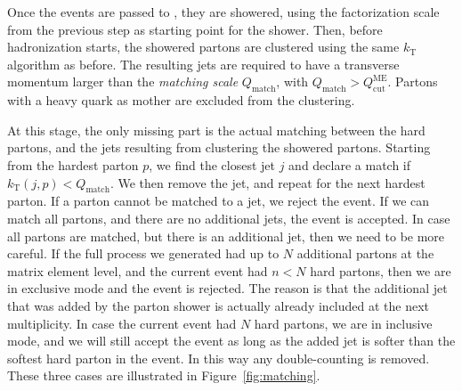 Once the events are passed to \PYTHIA, they are showered, using the factorization scale from the
previous step as starting point for the shower. Then, before hadronization starts, the showered
partons are clustered using the same $k_{\mathrm{T}}$ algorithm as before. The resulting jets are
required to have a transverse momentum larger than the \textit{matching scale} $Q_{\mathrm{match}}$,
with $Q_{\mathrm{match}} > Q_{\mathrm{cut}}^{\mathrm{ME}}$. 
Partons with a heavy quark as mother are excluded from the clustering. 

At this stage, the only missing part is the actual matching between the hard partons, and the jets
resulting from clustering the showered partons. Starting from the hardest parton $p$, we find the
closest jet $j$ and declare a match if $k_{\mathrm{T}}(j,p) < Q_{\mathrm{match}}$. We then remove
the jet, and repeat for the next hardest parton. If a parton cannot be matched to a jet, we reject
the event. 
If we can match all partons, and there are no additional jets, the event is accepted. 
In case all partons are matched, but there is an additional jet, then we need to be more careful. 
If the full process we generated had up to $N$ additional partons at the matrix element level, and
the current event had $n < N$ hard partons, then we are in exclusive mode and the event is rejected.
The reason is that the additional jet that was added by the parton shower is actually already
included at the next multiplicity. In case the current event had $N$ hard partons, we are in
inclusive mode, and we will still accept the event as long as the added jet is softer than the
softest hard parton in the event. 
In this way any double-counting is removed. These three cases are illustrated in
Figure~\ref{fig:matching}. 


